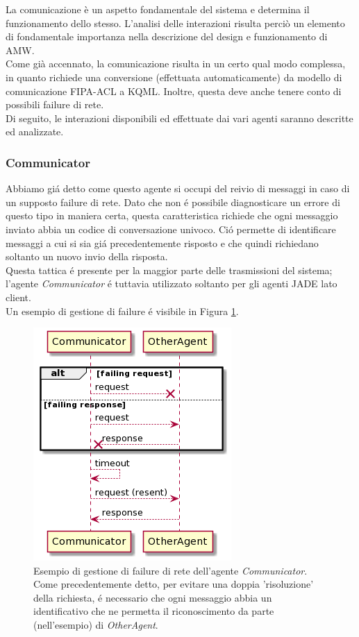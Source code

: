 La comunicazione è un aspetto fondamentale del sistema e determina il funzionamento dello stesso. L'analisi delle interazioni risulta perciò un elemento di fondamentale importanza nella descrizione del design e funzionamento di AMW.\\
Come già accennato, la comunicazione risulta in un certo qual modo complessa, in quanto richiede una conversione (effettuata automaticamente) da modello di comunicazione FIPA-ACL a KQML. Inoltre, questa deve anche tenere conto di possibili failure di rete.\\
Di seguito, le interazioni disponibili ed effettuate dai vari agenti saranno descritte ed analizzate.

\subsubsection{Communicator}
Abbiamo gi\'a detto come questo agente si occupi del reivio di messaggi in caso di un supposto failure di rete. Dato che non \'e possibile diagnosticare un errore di questo tipo in maniera certa, questa caratteristica richiede che ogni messaggio inviato abbia un codice di conversazione univoco. Ci\'o permette di identificare messaggi a cui si sia gi\'a precedentemente risposto e che quindi richiedano soltanto un nuovo invio della risposta.\\
Questa tattica \'e presente per la maggior parte delle trasmissioni del sistema; l'agente \textit{Communicator} \'e tuttavia utilizzato soltanto per gli agenti JADE lato client.\\
Un esempio di gestione di failure \'e visibile in Figura \ref{fig:communicator_sequence_diagram}.
\begin{figure}[!ht]\centering
    \includegraphics[width=.5\textwidth]{section/design/figure/agent/communicator_interaction.png}
    \caption{Esempio di gestione di failure di rete dell'agente \textit{Communicator}. Come precedentemente detto, per evitare una doppia 'risoluzione' della richiesta, \'e necessario che ogni messaggio abbia un identificativo che ne permetta il riconoscimento da parte (nell'esempio) di \textit{OtherAgent}.}
    \label{fig:communicator_sequence_diagram}
\end{figure}

